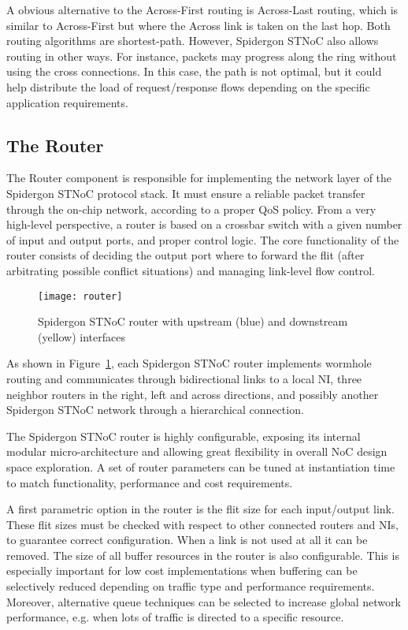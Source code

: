 A obvious alternative to the Across-First routing is Across-Last routing, which is similar to Across-First but where the Across link is taken on the last hop. 
Both routing algorithms are shortest-path. 
However, Spidergon STNoC also allows routing in other ways. 
For instance, packets may progress along the ring without using the cross connections. 
In this case, the path is not optimal, but it could help distribute the load of request/response flows depending on the specific application requirements.

\subsection{The Router}\label{S:router}

The Router component is responsible for implementing the network layer of the Spidergon STNoC protocol stack. 
It must ensure a reliable packet transfer through the on-chip network, according to a proper QoS policy. 
From a very high-level perspective, a router is based on a crossbar switch with a given number of input and output ports, and proper control logic. 
The core functionality of the router consists of deciding the output port where to forward the flit (after arbitrating possible conflict situations) and managing link-level flow control.

	\begin{figure}[ht]
	\centering
		\texttt{[image: router]}
		\caption{Spidergon STNoC router with upstream (blue) and downstream (yellow) interfaces}
		\label{fig:router}
	\end{figure}

As shown in Figure~\ref{fig:router}, each Spidergon STNoC router implements wormhole routing and communicates through bidirectional links to a local NI, three neighbor routers in the right, left and across directions, and possibly another Spidergon STNoC network through a hierarchical connection.

The Spidergon STNoC router is highly configurable, exposing its internal modular micro-architecture and allowing great flexibility in overall NoC design space exploration. 
A set of router parameters can be tuned at instantiation time to match functionality, performance and cost requirements.

A first parametric option in the router is the flit size for each input/output link. 
These flit sizes must be checked with respect to other connected routers and NIs, to guarantee correct configuration. 
When a link is not used at all it can be removed. 
The size of all buffer resources in the router is also configurable. This is especially important for low cost implementations when buffering can be selectively reduced depending on traffic type and performance requirements. 
Moreover, alternative queue techniques can be selected to increase global network performance, e.g. when lots of traffic is directed to a specific resource.


